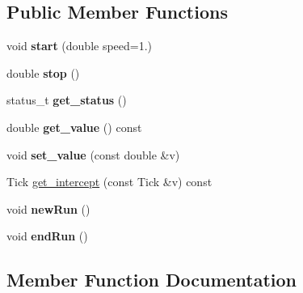 \subsection*{Public Member Functions}
\begin{DoxyCompactItemize}
\item 
void {\bfseries start} (double speed=1.)\hypertarget{classRTSim_1_1CapacityTimer_a322eee653084d4db6575165584ef877f}{}\label{classRTSim_1_1CapacityTimer_a322eee653084d4db6575165584ef877f}

\item 
double {\bfseries stop} ()\hypertarget{classRTSim_1_1CapacityTimer_a6f0eee77588c5c8d6ee94ddf65e2de90}{}\label{classRTSim_1_1CapacityTimer_a6f0eee77588c5c8d6ee94ddf65e2de90}

\item 
status\+\_\+t {\bfseries get\+\_\+status} ()\hypertarget{classRTSim_1_1CapacityTimer_a1d9f1c176a5c210df13553a9167e4e69}{}\label{classRTSim_1_1CapacityTimer_a1d9f1c176a5c210df13553a9167e4e69}

\item 
double {\bfseries get\+\_\+value} () const \hypertarget{classRTSim_1_1CapacityTimer_a2bed2767d8a20ec3d18cd22c368bb994}{}\label{classRTSim_1_1CapacityTimer_a2bed2767d8a20ec3d18cd22c368bb994}

\item 
void {\bfseries set\+\_\+value} (const double \&v)\hypertarget{classRTSim_1_1CapacityTimer_a405338790f98fd704d01a04eef91b262}{}\label{classRTSim_1_1CapacityTimer_a405338790f98fd704d01a04eef91b262}

\item 
Tick \hyperlink{classRTSim_1_1CapacityTimer_ab82cbe42cba083a82a50e6fa07b19f08}{get\+\_\+intercept} (const Tick \&v) const 
\item 
void {\bfseries new\+Run} ()\hypertarget{classRTSim_1_1CapacityTimer_a3d40f3892def6cb85d780b2f5aeeadf2}{}\label{classRTSim_1_1CapacityTimer_a3d40f3892def6cb85d780b2f5aeeadf2}

\item 
void {\bfseries end\+Run} ()\hypertarget{classRTSim_1_1CapacityTimer_a55c2366b4148a2d2e9efceba0e75c8c0}{}\label{classRTSim_1_1CapacityTimer_a55c2366b4148a2d2e9efceba0e75c8c0}

\end{DoxyCompactItemize}


\subsection{Member Function Documentation}
